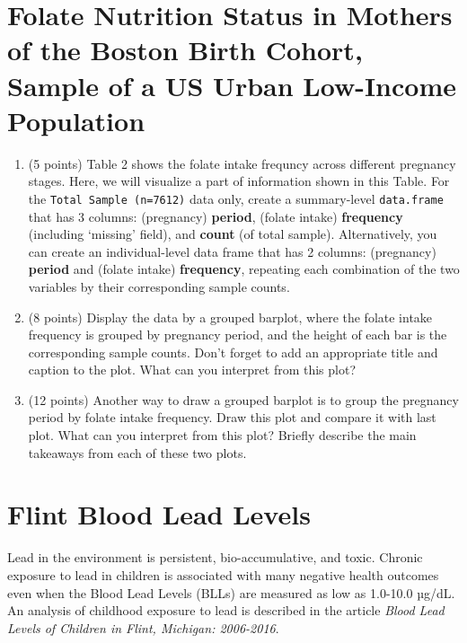 \documentclass[letterpaper,11pt,twoside,]{pinp}
\begin{document}
\hypertarget{folate-nutrition-status-in-mothers-of-the-boston-birth-cohort-sample-of-a-us-urban-low-income-population}{%
\section{Folate Nutrition Status in Mothers of the Boston Birth Cohort,
Sample of a US Urban Low-Income
Population}\label{folate-nutrition-status-in-mothers-of-the-boston-birth-cohort-sample-of-a-us-urban-low-income-population}}

\begin{enumerate}
\def\labelenumi{\alph{enumi})}
\item
  (5 points) Table 2 shows the folate intake frequncy across different
  pregnancy stages. Here, we will visualize a part of information shown
  in this Table. For the \texttt{Total\ Sample\ (n=7612)} data only,
  create a summary-level \texttt{data.frame} that has 3 columns:
  (pregnancy) \textbf{period}, (folate intake) \textbf{frequency}
  (including `missing' field), and \textbf{count} (of total sample).
  Alternatively, you can create an individual-level data frame that has
  2 columns: (pregnancy) \textbf{period} and (folate intake)
  \textbf{frequency}, repeating each combination of the two variables by
  their corresponding sample counts.
\item
  (8 points) Display the data by a grouped barplot, where the folate
  intake frequency is grouped by pregnancy period, and the height of
  each bar is the corresponding sample counts. Don't forget to add an
  appropriate title and caption to the plot. What can you interpret from
  this plot?
\item
  (12 points) Another way to draw a grouped barplot is to group the
  pregnancy period by folate intake frequency. Draw this plot and
  compare it with last plot. What can you interpret from this plot?
  Briefly describe the main takeaways from each of these two plots.
\end{enumerate}

\hypertarget{flint-blood-lead-levels}{%
\section{Flint Blood Lead Levels}\label{flint-blood-lead-levels}}

Lead in the environment is persistent, bio-accumulative, and toxic.
Chronic exposure to lead in children is associated with many negative
health outcomes even when the Blood Lead Levels (BLLs) are measured as
low as 1.0-10.0 µg/dL. An analysis of childhood exposure to lead is
described in the article \emph{Blood Lead Levels of Children in Flint,
Michigan: 2006-2016}.
\end{document}
